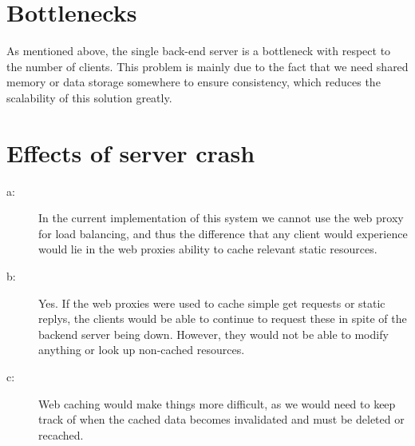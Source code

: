 \section{Bottlenecks}
As mentioned above, the single back-end server is a bottleneck with respect to the number of clients. This problem is mainly due to the fact that we need shared memory or data storage somewhere to ensure consistency, which reduces the scalability of this solution greatly.

\section{Effects of server crash}
\begin{description}
\item[a:] In the current implementation of this system we cannot use the web proxy for load balancing, and thus the difference that any client would experience would lie in the web proxies ability to cache relevant static resources.
\item[b:] Yes. If the web proxies were used to cache simple get requests or static replys, the clients would be able to continue to request these in spite of the backend server being down. However, they would not be able to modify anything or look up non-cached resources.
\item[c:] Web caching would make things more difficult, as we would need to keep track of when the cached data becomes invalidated and must be deleted or recached.
\end{description}